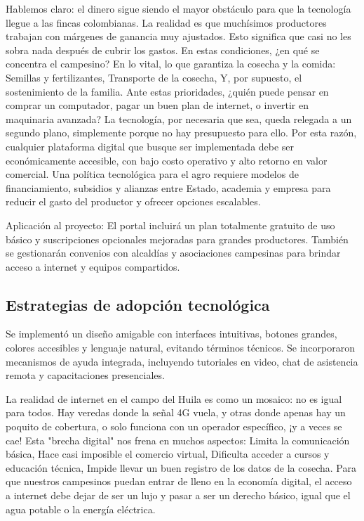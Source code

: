 Hablemos claro: el dinero sigue siendo el mayor obstáculo para que la tecnología llegue a las fincas colombianas. La realidad es que muchísimos productores trabajan con márgenes de ganancia muy ajustados. Esto significa que casi no les sobra nada después de cubrir los gastos. En estas condiciones, ¿en qué se concentra el campesino? En lo vital, lo que garantiza la cosecha y la comida: Semillas y fertilizantes, Transporte de la cosecha, Y, por supuesto, el sostenimiento de la familia. Ante estas prioridades, ¿quién puede pensar en comprar un computador, pagar un buen plan de internet, o invertir en maquinaria avanzada? La tecnología, por necesaria que sea, queda relegada a un segundo plano, simplemente porque no hay presupuesto para ello. Por esta razón, cualquier plataforma digital que busque ser implementada debe ser económicamente accesible, con bajo costo operativo y alto retorno en valor comercial. Una política tecnológica para el agro requiere modelos de financiamiento, subsidios y alianzas entre Estado, academia y empresa para reducir el gasto del productor y ofrecer opciones escalables.

Aplicación al proyecto: El portal incluirá un plan totalmente gratuito de uso básico y suscripciones opcionales mejoradas para grandes productores. También se gestionarán convenios con alcaldías y asociaciones campesinas para brindar acceso a internet y equipos compartidos.

\subsection{Estrategias de adopción tecnológica}
Se implementó un diseño amigable con interfaces intuitivas, botones grandes, colores accesibles y lenguaje natural, evitando términos técnicos. Se incorporaron mecanismos de ayuda integrada, incluyendo tutoriales en video, chat de asistencia remota y capacitaciones presenciales.

La realidad de internet en el campo del Huila es como un mosaico: no es igual para todos. Hay veredas donde la señal 4G vuela, y otras donde apenas hay un poquito de cobertura, o solo funciona con un operador específico, ¡y a veces se cae! Esta "brecha digital" nos frena en muchos aspectos: Limita la comunicación básica, Hace casi imposible el comercio virtual, Dificulta acceder a cursos y educación técnica, Impide llevar un buen registro de los datos de la cosecha. Para que nuestros campesinos puedan entrar de lleno en la economía digital, el acceso a internet debe dejar de ser un lujo y pasar a ser un derecho básico, igual que el agua potable o la energía eléctrica.

